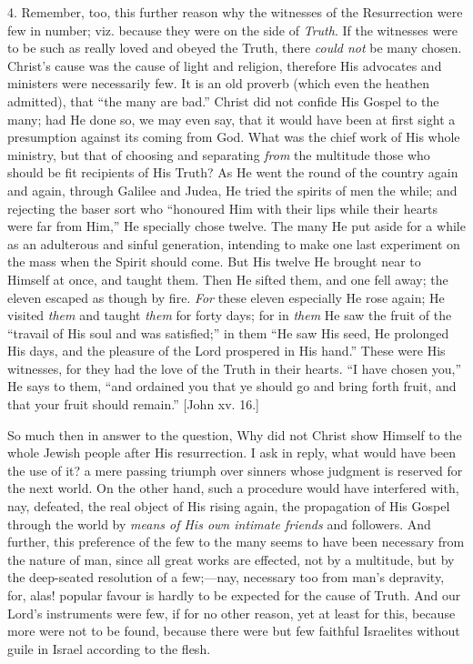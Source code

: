 4. Remember, too, this further reason why the
witnesses of the Resurrection were few in number; viz.
because they were on the side of \emph{Truth}. If the
witnesses were to be such as really loved and obeyed the
Truth, there \emph{could not} be many chosen. Christ's
cause was the cause of light and religion, therefore His
advocates and ministers were necessarily few. It is an
old proverb (which even the heathen admitted), that
``the many are bad.'' Christ did not confide His
Gospel to the many; had He done so, we may even say, that
it would have been at first sight a presumption against
its coming from God. What was the chief work of His whole
ministry, but that of choosing and separating \emph{from}
the multitude those who should be fit recipients of His
Truth? As He went the round of the country again and
again, through Galilee and Judea, He tried the spirits of
men the while; and rejecting the baser sort who
``honoured Him with their lips while their hearts
were far from Him,'' He specially chose twelve. The
many He put aside for a while as an adulterous and sinful
generation, intending to make one last experiment on the
mass when the Spirit should come. But His twelve He
brought near to Himself at once, and taught them. Then He
sifted them, and one fell away; the eleven escaped as
though by fire. \emph{For} these eleven especially He
rose again; He visited \emph{them} and taught \emph{them}
for forty days; for in \emph{them} He saw the fruit of
the ``travail of His soul and was satisfied;'' in
them ``He saw His seed, He prolonged His days, and
the pleasure of the Lord prospered in His hand.''
These were His witnesses, for they had the love of the
Truth in their hearts. ``I have chosen you,'' He
says to them, ``and ordained you that ye should go
and bring forth fruit, and that your fruit should
remain.'' [John xv. 16.]

So much then in answer to the question, Why did not
Christ show Himself to the whole Jewish people after His
resurrection. I ask in reply, what would have been the
use of it? a mere passing triumph over sinners whose
judgment is reserved for the next world. On the other
hand, such a procedure would have interfered with, nay,
defeated, the real object of His rising again, the
propagation of His Gospel through the world by \emph{means
of His own intimate friends} and followers. And
further, this preference of the few to the many seems to
have been necessary from the nature of man, since all
great works are effected, not by a multitude, but by the deep-seated resolution of a few;—nay, necessary too
from man's depravity, for, alas! popular favour is hardly
to be expected for the cause of Truth. And our Lord's
instruments were few, if for no other reason, yet at
least for this, because more were not to be found,
because there were but few faithful Israelites without
guile in Israel according to the flesh.

